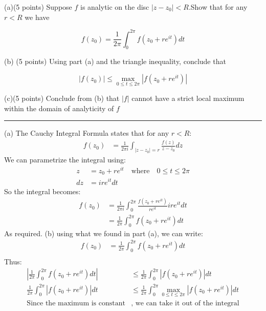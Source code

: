 \begin{example}

    (a)(5 points) Suppose $f$ is analytic on the disc $|z-z_0|<R$.Show that for any $r<R$ we have

    $$f(z_0)=\frac1{2\pi}\int_0^{2\pi}f(z_0+re^{it})dt$$

    (b) (5 points) Using part (a) and the triangle inequality, conclude that

    $$|f(z_0)|\leq\max_{0\leq t\leq2\pi}|f(z_0+re^{it})|$$

    (c)(5 points) Conclude from (b) that $|f|$ cannot have a strict local maximum within the domain of analyticity of $f$

    \hrule
    \vspace{0.5cm}

    (a) The Cauchy Integral Formula states that for any $r<R$:
    \begin{align*}
        f(z_0) & = \frac{1}{2\pi i} \int_{|z-z_0| = r} \frac{f(z)}{z - z_0} dz
    \end{align*}
    We can parametrize the integral using:
    \begin{align*}
        z  & = z_0 + re^{it} \quad \text{where} \quad 0 \leq t \leq 2\pi \\
        dz & = ire^{it}dt
    \end{align*}
    So the integral becomes:
    \begin{align*}
        f(z_0) & = \frac{1}{2\pi i} \int_{0}^{2\pi} \frac{f(z_0 + re^{it})}{re^{it}} ire^{it} dt \\
               & = \frac{1}{2\pi} \int_{0}^{2\pi} f(z_0 + re^{it}) dt
    \end{align*}
    As required.
    (b) using what we found in part (a), we can write:
    \begin{align*}
        f(z_0) & = \frac{1}{2\pi} \int_{0}^{2\pi} f(z_0 + re^{it}) dt \\
    \end{align*}
    Thus:
    \begin{align*}
        \left|\frac{1}{2\pi} \int_{0}^{2\pi} f(z_0 + re^{it}) dt \right|         & \leq \frac{1}{2\pi} \int_{0}^{2\pi} |f(z_0 + re^{it})| dt                     \\
        \frac{1}{2\pi} \int_{0}^{2\pi} |f(z_0 + re^{it})| dt                     & \leq \frac{1}{2\pi} \int_{0}^{2\pi} \max_{0\leq t\leq2\pi}|f(z_0+re^{it})| dt \\
        \text{Since the maximum is constant}                                     & \text{, we can take it out of the integral}                                   \\

\end{align*}
\end{example}
